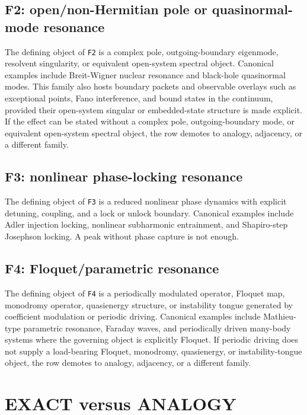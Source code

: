 \documentclass[aps,pra,reprint,nofootinbib]{revtex4-2}
\begin{document}
\subsection{F2: open/non-Hermitian pole or quasinormal-mode resonance}

The defining object of \texttt{F2} is a complex pole, outgoing-boundary eigenmode, resolvent singularity, or equivalent open-system spectral object. Canonical examples include Breit-Wigner nuclear resonance and black-hole quasinormal modes. This family also hosts boundary packets and observable overlays such as exceptional points, Fano interference, and bound states in the continuum, provided their open-system singular or embedded-state structure is made explicit. If the effect can be stated without a complex pole, outgoing-boundary mode, or equivalent open-system spectral object, the row demotes to analogy, adjacency, or a different family.

\subsection{F3: nonlinear phase-locking resonance}

The defining object of \texttt{F3} is a reduced nonlinear phase dynamics with explicit detuning, coupling, and a lock or unlock boundary. Canonical examples include Adler injection locking, nonlinear subharmonic entrainment, and Shapiro-step Josephson locking. A peak without phase capture is not enough.

\subsection{F4: Floquet/parametric resonance}

The defining object of \texttt{F4} is a periodically modulated operator, Floquet map, monodromy operator, quasienergy structure, or instability tongue generated by coefficient modulation or periodic driving. Canonical examples include Mathieu-type parametric resonance, Faraday waves, and periodically driven many-body systems where the governing object is explicitly Floquet. If periodic driving does not supply a load-bearing Floquet, monodromy, quasienergy, or instability-tongue object, the row demotes to analogy, adjacency, or a different family.

\section{EXACT versus ANALOGY}
\end{document}
